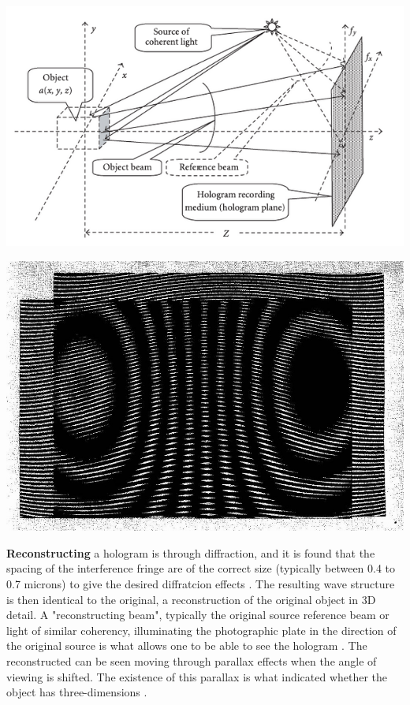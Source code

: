 \documentclass[12pt]{article}
\begin{document}
\begin{minipage}{.49\textwidth}
    \captionsetup{hypcap=false}
    \centering
    \includegraphics[width=\linewidth]{hologram construction.png}
    \label{fig:1}
\end{minipage}
\hfill
\begin{minipage}{.49\textwidth}
    \captionsetup{hypcap=false}
    \centering
    \includegraphics[width=\linewidth]{holo interference.jpg}
    \label{fig:2}
\end{minipage}

\textbf{Reconstructing} a hologram is through diffraction, and it is found that the spacing of the interference fringe are of the correct size (typically between 0.4 to 0.7 microns) to give the desired diffratcion effects 
\cite{UCDholo}.
The resulting wave structure is then identical to the original, a reconstruction of the original object in 3D detail.
A "reconstructing beam", typically the original source reference beam or light of similar coherency, illuminating the photographic plate in the direction of the original source is what allows one to be able to see the hologram
\cite{UCDholo}.
The reconstructed can be seen moving through parallax effects when the angle of viewing is shifted. The existence of this parallax is what indicated whether the object has three-dimensions \cite{UCDholo}.
\end{document}
